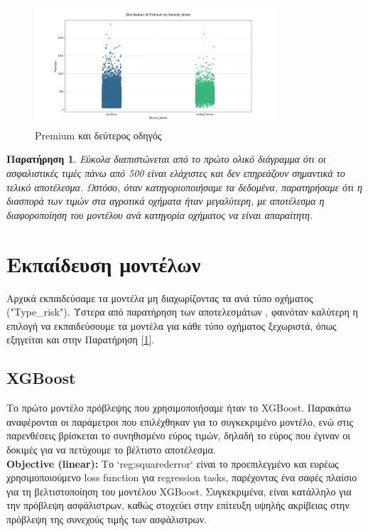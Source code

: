 \documentclass{llncs}
\newtheorem{observation}{Παρατήρηση}
\begin{document}
\begin{figure}[h!]
    \begin{center}
        \includegraphics[width=0.8\textwidth]{images/Second_driver_ALL.png}
    \end{center}
    \caption{Premium και δεύτερος οδηγός} 
    \label{fig:premium_second_driver}   
\end{figure}


\begin{observation}
    \label{observation:first}
    Εύκολα διαπιστώνεται από το πρώτο ολικό διάγραμμα ότι οι ασφαλιστικές τιμές πάνω από 500 είναι ελάχιστες και δεν επηρεάζουν σημαντικά το τελικό αποτέλεσμα. Ωστόσο, όταν κατηγοριοποιήσαμε τα δεδομένα, παρατηρήσαμε ότι η διασπορά των τιμών στα αγροτικά οχήματα ήταν μεγαλύτερη, με αποτέλεσμα η διαφοροποίηση του μοντέλου ανά κατηγορία οχήματος να είναι απαραίτητη.
\end{observation}

\section{Εκπαίδευση μοντέλων}
Αρχικά εκπαιδεύσαμε τα μοντέλα μη διαχωρίζοντας τα ανά τύπο οχήματος ("Type\_risk"). Ύστερα από παρατήρηση των αποτελεσμάτων , φαινόταν καλύτερη η επιλογή να εκπαιδεύσουμε τα μοντέλα για κάθε τύπο οχήματος ξεχωριστά, όπως εξηγείται και στην Παρατήρηση [\ref{observation:first}].

\subsection{XGBoost}
Το πρώτο μοντέλο πρόβλεψης που χρησιμοποιήσαμε ήταν το XGBoost. Παρακάτω αναφέρονται οι παράμετροι που επιλέχθηκαν για το συγκεκριμένο μοντέλο, ενώ στις παρενθέσεις βρίσκεται το συνηθισμένο εύρος τιμών, δηλαδή το εύρος που έγιναν οι δοκιμές για να πετύχουμε το βέλτιστο αποτέλεσμα.\\

\noindent \textbf{Objective (linear):}
Το `reg:squarederror` είναι το προεπιλεγμένο και ευρέως χρησιμοποιούμενο loss function για regression tasks, παρέχοντας ένα σαφές πλαίσιο για τη βελτιστοποίηση του μοντέλου XGBoost. Συγκεκριμένα, είναι κατάλληλο για την πρόβλεψη ασφάλιστρων, καθώς στοχεύει στην επίτευξη υψηλής ακρίβειας στην πρόβλεψη της συνεχούς τιμής των ασφάλιστρων. \\
\end{document}
